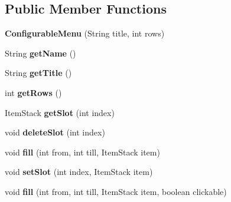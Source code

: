 \subsection*{Public Member Functions}
\begin{DoxyCompactItemize}
\item 
\mbox{\label{class_a_p_i_1_1_configurable_menu_ad93a4169815f31670e1fa7f2b7394f06}} 
{\bfseries Configurable\+Menu} (String title, int rows)
\item 
\mbox{\label{class_a_p_i_1_1_configurable_menu_ad3245c6614752c20cbff49cad0b5ebc5}} 
String {\bfseries get\+Name} ()
\item 
\mbox{\label{class_a_p_i_1_1_configurable_menu_a274f2bcf031a3cd151395b5086dfffd0}} 
String {\bfseries get\+Title} ()
\item 
\mbox{\label{class_a_p_i_1_1_configurable_menu_acfb59e184a2cf28e6813272d72673da5}} 
int {\bfseries get\+Rows} ()
\item 
\mbox{\label{class_a_p_i_1_1_configurable_menu_a47cf45c112156a2c731bce39e1abe706}} 
Item\+Stack {\bfseries get\+Slot} (int index)
\item 
\mbox{\label{class_a_p_i_1_1_configurable_menu_a9f60e47822b4231d688114c627332d0c}} 
void {\bfseries delete\+Slot} (int index)
\item 
\mbox{\label{class_a_p_i_1_1_configurable_menu_a61167dfe546ae011949531b34f551bee}} 
void {\bfseries fill} (int from, int till, Item\+Stack item)
\item 
\mbox{\label{class_a_p_i_1_1_configurable_menu_a33465b44c775dab604f35906d4df9f1a}} 
void {\bfseries set\+Slot} (int index, Item\+Stack item)
\item 
\mbox{\label{class_a_p_i_1_1_configurable_menu_a92f5b1dfe5d6ef2d958ae2d7dd8a874e}} 
void {\bfseries fill} (int from, int till, Item\+Stack item, boolean clickable)

\end{DoxyCompactItemize}
